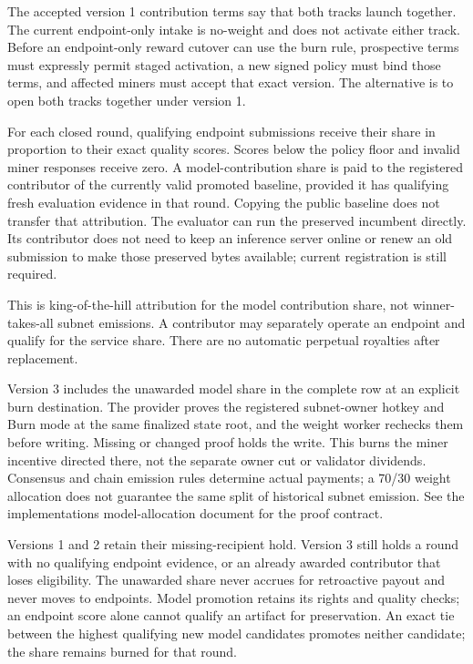 The accepted version 1 contribution terms say that both tracks launch together.
The current endpoint-only intake is no-weight and does not activate either track.
Before an endpoint-only reward cutover can use the burn rule, prospective terms
must expressly permit staged activation, a new signed policy must bind those
terms, and affected miners must accept that exact version. The alternative is to
open both tracks together under version 1.

For each closed round, qualifying endpoint submissions receive their share
in proportion to their exact quality scores. Scores below the policy floor
and invalid miner responses receive zero. A model-contribution share is paid
to the registered contributor of the currently valid promoted baseline,
provided it has qualifying fresh evaluation evidence in that round.
Copying the public baseline does not transfer that attribution.
The evaluator can run the preserved incumbent directly. Its contributor does
not need to keep an inference server online or renew an old submission to
make those preserved bytes available; current registration is still required.

This is king-of-the-hill attribution for the model contribution share,
not winner-takes-all subnet emissions. A contributor may separately operate
an endpoint and qualify for the service share. There are no automatic
perpetual royalties after replacement.

Version 3 includes the unawarded model share in the complete row at an explicit
burn destination. The provider proves the registered subnet-owner hotkey and
Burn mode at the same finalized state root, and the weight worker rechecks them
before writing. Missing or changed proof holds the write. This burns the miner
incentive directed there, not the separate owner cut or validator dividends.
Consensus and chain emission rules determine actual payments; a 70/30 weight
allocation does not guarantee the same split of historical subnet emission.
See the implementation\textquotesingle s model-allocation document for the proof contract.

Versions 1 and 2 retain their missing-recipient hold. Version 3 still holds a
round with no qualifying endpoint evidence, or an already awarded contributor
that loses eligibility. The unawarded share never accrues for retroactive payout
and never moves to endpoints. Model promotion retains its rights and quality
checks; an endpoint score alone cannot qualify an artifact for preservation.
An exact tie between the highest qualifying new model candidates promotes
neither candidate; the share remains burned for that round.

